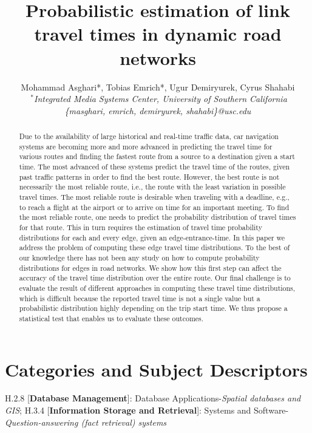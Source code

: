 \documentclass[]{sig-alternate}
\title{Probabilistic estimation of link travel times in dynamic road networks}
\author{{Mohammad Asghari*, Tobias Emrich*, Ugur Demiryurek, Cyrus Shahabi}
  \vspace{1.6mm}\\
  \fontsize{10}{10}\selectfont\rmfamily\itshape
  $~^{*}$Integrated Media Systems Center, University of Southern California\\
  \fontsize{9}{9}\selectfont\ttfamily\upshape
  \{masghari, emrich, demiryurek, shahabi\}@usc.edu
}
\begin{document}
\maketitle

\begin{abstract}

Due to the availability of large historical and real-time traffic data, car navigation systems are becoming more and more advanced in predicting the travel time for various routes and finding the fastest route from a source to a destination given a start time.  The most advanced of these systems predict the travel time of the routes, given past traffic patterns in order to find the best route. However, the best route is not necessarily the most reliable route, i.e., the route with the least variation in possible travel times. The most reliable route is desirable when traveling with a deadline, e.g., to reach a flight at the airport or to arrive on time for an important meeting.  To find the most reliable route, one needs to predict the probability distribution of travel times for that route. This in turn requires the estimation of travel time probability distributions for each and every edge, given an edge-entrance-time. In this paper we address the problem of computing these edge travel time distributions. To the best of our knowledge there has not been any study on how to compute probability distributions for edges in road networks. We show how this first step can affect the accuracy of the travel time distribution over the entire route. Our final challenge is to evaluate the result of different approaches in computing these travel time distributions, which is difficult because the reported travel time is not a single value but a probabilistic distribution highly depending on the trip start time.  We thus propose a statistical test that enables us to evaluate these outcomes.
\end{abstract}
\vspace{-0.15in}
\section*{Categories and Subject Descriptors}
\vspace{-0.025in}
H.2.8 [\textbf{Database Management}]: Database Applications-\textit{Spatial databases and GIS}; H.3.4 [\textbf{Information Storage and Retrieval}]: Systems and Software-\textit{Question-answering (fact retrieval) systems}

\vspace{-0.1in}
\end{document}
